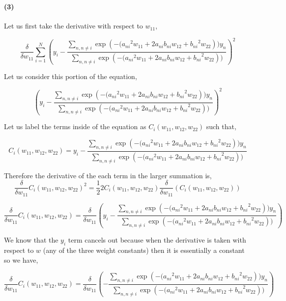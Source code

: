 \documentclass[submit]{harvardml}
\begin{document}
\begin{tcolorbox}[breakable]
\textbf{(3)}\\\\

Let us first take the derivative with respect to $w_{11}$,

$$ \frac{\delta}{\delta w_{11}} \sum\limits_{i = 1}^N \left( y_i - \frac{ \sum\limits_{n, n \neq i} \exp\left(- ({a_{ni}}^2w_{11} + 2a_{ni}b_{ni}w_{12} + {b_{ni}}^2w_{22}\right))y_n  }{ \sum\limits_{n, n \neq i} \exp\left(- ({a_{ni}}^2w_{11} + 2a_{ni}b_{ni}w_{12} + {b_{ni}}^2w_{22}\right)) } \right)^2$$

Let us consider this portion of the equation,

$$ \left( y_i - \frac{ \sum\limits_{n, n \neq i} \exp\left(- ({a_{ni}}^2w_{11} + 2a_{ni}b_{ni}w_{12} + {b_{ni}}^2w_{22}\right))y_n  }{ \sum\limits_{n, n \neq i} \exp\left(- ({a_{ni}}^2w_{11} + 2a_{ni}b_{ni}w_{12} + {b_{ni}}^2w_{22}\right)) } \right)^2 $$

Let us label the terms inside of the equation as $C_i(w_{11},w_{12},w_{22})$ such that,

$$ C_i(w_{11},w_{12},w_{22}) = y_i - \frac{ \sum\limits_{n, n \neq i} \exp\left(- ({a_{ni}}^2w_{11} + 2a_{ni}b_{ni}w_{12} + {b_{ni}}^2w_{22}\right))y_n  }{ \sum\limits_{n, n \neq i} \exp\left(- ({a_{ni}}^2w_{11} + 2a_{ni}b_{ni}w_{12} + {b_{ni}}^2w_{22}\right)) }$$

Therefore the derivative of the each term in the larger summation is, 
$$ \frac{\delta}{\delta w_{11}} {C_i(w_{11},w_{12},w_{22})}^2 = \frac{1}{2}2{C_i(w_{11},w_{12},w_{22})}\frac{\delta}{\delta w_{11}}(C_i(w_{11},w_{12},w_{22})) $$

$$ \frac{\delta}{\delta w_{11}} C_i(w_{11},w_{12},w_{22}) = \frac{\delta}{\delta w_{11}} \left( y_i - \frac{ \sum\limits_{n, n \neq i} \exp\left(- ({a_{ni}}^2w_{11} + 2a_{ni}b_{ni}w_{12} + {b_{ni}}^2w_{22}\right))y_n  }{ \sum\limits_{n, n \neq i} \exp\left(- ({a_{ni}}^2w_{11} + 2a_{ni}b_{ni}w_{12} + {b_{ni}}^2w_{22}\right)) } \right)$$

We know that the $y_i$ term cancels out because when the derivative is taken with respect to $w$ (any of the three weight constants) then it is essentially a constant so we have,

$$ \frac{\delta}{\delta w_{11}} C_i(w_{11},w_{12},w_{22}) = \frac{\delta}{\delta w_{11}} \left( - \frac{ \sum\limits_{n, n \neq i} \exp\left(- ({a_{ni}}^2w_{11} + 2a_{ni}b_{ni}w_{12} + {b_{ni}}^2w_{22}\right))y_n  }{ \sum\limits_{n, n \neq i} \exp\left(- ({a_{ni}}^2w_{11} + 2a_{ni}b_{ni}w_{12} + {b_{ni}}^2w_{22}\right)) } \right)$$


\end{tcolorbox}
\end{document}
